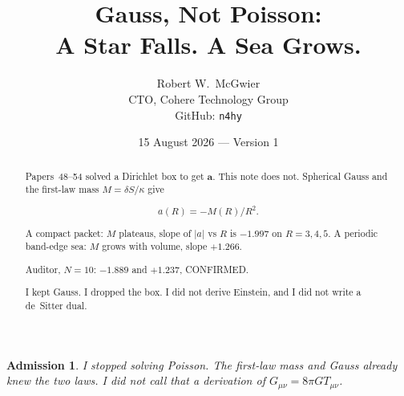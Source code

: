 \documentclass[11pt]{article}
\title{\textbf{Gauss, Not Poisson:\\
A Star Falls. A Sea Grows.}}
\author{Robert W.\ McGwier\\
\small CTO, Cohere Technology Group\\
\small GitHub: \texttt{n4hy}}
\date{15 August 2026 --- Version 1}
\newtheorem*{admission}{Admission}
\begin{document}
\maketitle

\begin{abstract}
\noindent
Papers~48--54 solved a Dirichlet box to get
$\mathbf{a}$. This note does not. Spherical Gauss
and the first-law mass $M=\delta S/\kappa$ give

\[
a(R)=-M(R)/R^2.
\]

A compact packet: $M$ plateaus, slope of $|a|$ vs
$R$ is $-1.997$ on $R=3,4,5$. A periodic band-edge
sea: $M$ grows with volume, slope $+1.266$.

Auditor, $N=10$: $-1.889$ and $+1.237$, CONFIRMED.

I kept Gauss. I dropped the box. I did not derive
Einstein, and I did not write a de~Sitter dual.
\end{abstract}

\begin{admission}
I stopped solving Poisson. The first-law mass and
Gauss already knew the two laws. I did not call
that a derivation of $G_{\mu\nu}=8\pi G T_{\mu\nu}$.
\end{admission}
\end{document}
